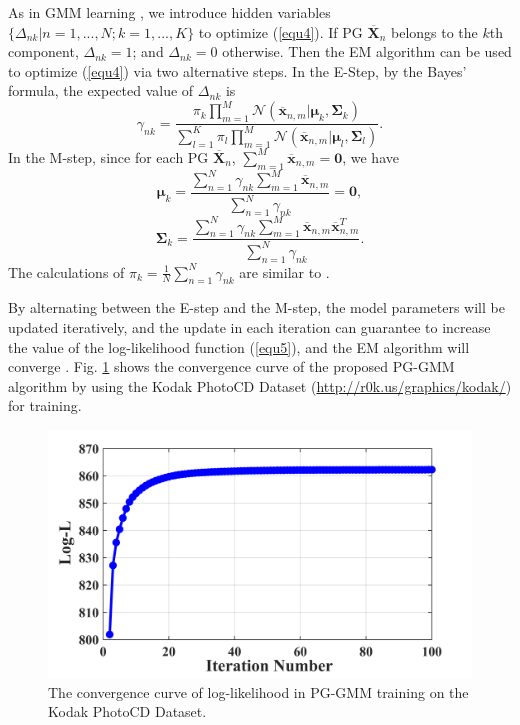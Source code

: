 As in GMM learning \cite{Bishop}, we introduce hidden variables $\{\Delta_{nk}|n=1,...,N;k=1,...,K\}$ to optimize (\ref{equ4}). If PG $\bm{\overline{X}}_{n}$ belongs to the $k$th component, $\Delta_{nk}=1$; and $\Delta_{nk}=0$ otherwise. Then the EM algorithm \cite{em} can be used to optimize (\ref{equ4}) via two alternative steps. In the E-Step, by the Bayes' formula, the expected value of $\Delta_{nk}$ is
\begin{equation}\label{equ5}
\gamma_{nk}=\frac{\pi_{k}\prod_{m=1}^{M}\mathcal{N}(\bm{\overline{x}}_{n,m}|\bm{\mu}_{k},\bm{\Sigma}_{k})}{\sum_{l=1}^{K}\pi_{l}\prod_{m=1}^{M}\mathcal{N}(\bm{\overline{x}}_{n,m}|\bm{\mu}_{l},\bm{\Sigma}_{l})}.
\end{equation}
In the M-step, since for each PG $\bm{\overline{X}}_{n}$, $\sum_{m=1}^{M}\bm{\overline{x}}_{n,m}=\bm{0}$, we have
\begin{equation}
\label{equ6}
\bm{\mu}_{k} = \frac{\sum_{n=1}^{N}\gamma_{nk}\sum_{m=1}^{M}\bm{\overline{x}}_{n,m}}{\sum_{n=1}^{N}\gamma_{nk}}=\bm{0},
\end{equation}
\begin{equation}\label{equ7}
\bm{\Sigma}_{k} = \frac{\sum_{n=1}^{N}\gamma_{nk}\sum_{m=1}^{M}\bm{\overline{x}}_{n,m}\bm{\overline{x}}_{n,m}^{T}}{\sum_{n=1}^{N}\gamma_{nk}}.
\end{equation}
The calculations of $\pi_{k}=\frac{1}{N}\sum_{n=1}^{N}\gamma_{nk}$ are similar to \cite{Bishop}.

By alternating between the E-step and the M-step, the model parameters will be updated iteratively, and the update in each iteration can guarantee to increase the value of the log-likelihood function (\ref{equ5}), and the EM algorithm will converge \cite{Bishop,emconvergence}. Fig. \ref{fig3} shows the convergence curve of the proposed PG-GMM algorithm by using the Kodak PhotoCD Dataset (\url{http://r0k.us/graphics/kodak/}) for training.
\begin{figure}[t]
\centering
\includegraphics[width=0.75\linewidth]{images/pgpd/cvgc.png}
\caption{The convergence curve of log-likelihood in PG-GMM training on the Kodak PhotoCD Dataset.
}
\label{fig3}
\end{figure}


